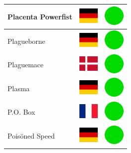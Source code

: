 \documentclass[12pt, a4paper, twoside]{report}
\begin{document}
\begin{center}
\begin{longtable}{|p{5cm}|p{2cm}|p{2cm}|}
 Placenta Powerfist                                         & \includegraphics[width=1cm]{../img/flags/de} &   \includegraphics[width=1cm]{../likes/y} \\ \hline
 Plagueborne                                                & \includegraphics[width=1cm]{../img/flags/de} &   \includegraphics[width=1cm]{../likes/y} \\ \hline
 Plaguemace                                                 & \includegraphics[width=1cm]{../img/flags/dk} &   \includegraphics[width=1cm]{../likes/y} \\ \hline
 Plasma                                                     & \includegraphics[width=1cm]{../img/flags/de} &   \includegraphics[width=1cm]{../likes/y} \\ \hline
 P.O. Box                                                   & \includegraphics[width=1cm]{../img/flags/fr} &   \includegraphics[width=1cm]{../likes/y} \\ \hline
 Poisöned Speed                                             & \includegraphics[width=1cm]{../img/flags/de} &   \includegraphics[width=1cm]{../likes/y} \\ \hline

\end{longtable}
\end{center}
\end{document}
